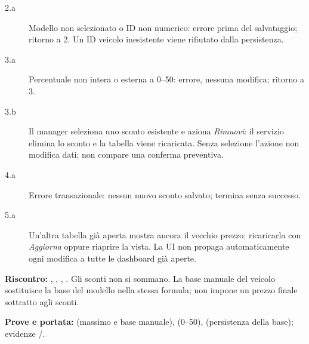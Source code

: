 \begin{description}
\item[2.a] Modello non selezionato o ID non numerico: errore prima del salvataggio;
  ritorno a 2. Un ID veicolo inesistente viene rifiutato dalla persistenza.
\item[3.a] Percentuale non intera o esterna a 0--50: errore, nessuna modifica; ritorno a 3.
\item[3.b] Il manager seleziona uno sconto esistente e aziona \emph{Rimuovi}:
  il servizio elimina lo sconto e la tabella viene ricaricata.
  Senza selezione l'azione non modifica dati; non compare una conferma preventiva.
\item[4.a] Errore transazionale: nessun nuovo sconto salvato; termina senza successo.
\item[5.a] Un'altra tabella gi\`a aperta mostra ancora il vecchio prezzo:
  ricaricarla con \emph{Aggiorna} oppure riaprire la vista.
  La UI non propaga automaticamente ogni modifica a tutte le dashboard gi\`a aperte.
\end{description}
\begin{flushleft}\textbf{Riscontro:} , ,
, . Gli sconti non
si sommano. La base manuale del veicolo sostituisce la base del modello nella
stessa formula; non impone un prezzo finale sottratto agli sconti.\end{flushleft}


\begin{flushleft}\noindent\textbf{Prove e portata:}  (massimo e base manuale),  (0--50),  (persistenza della base); evidenze /.\end{flushleft}

